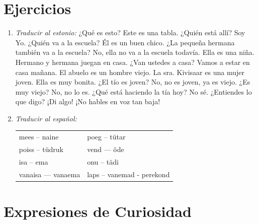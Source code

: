 \Large{\section*{Ejercicios}}

\begin{enumerate}
	\item \emph{Traducir al estonio:} ¿Qué es esto? Este es una tabla. ¿Quién está allí? Soy Yo. ¿Quién va a la escuela? Él es un buen chico. ¿La pequeña hermana también va a la escuela? No, ella no va a la escuela todavía. Ella es una niña. Hermano y hermana juegan en casa. ¿Van ustedes a casa? Vamos a estar en casa mañana. El abuelo es un hombre viejo. La sra. Kivisaar es una mujer joven. Ella es muy bonita. ¿El tío es joven? No, no es joven, ya es viejo. ¿Es muy viejo? No, no lo es. ¿Qué está haciendo la tía hoy? No sé. ¿Entiendes lo que digo? ¡Di algo! ¡No hables en voz tan baja!

	\item \emph{Traducir al español:} 

	\begin{center}
	\begin{tabular}{ l l }
		mees -- naine		& poeg -- tütar \\  
		poiss -- tüdruk   	& vend — õde \\ 
		isa -- ema 			& onu -- tädi \\
		vanaisa — vanaema	& laps -- vanemad - perekond
	\end{tabular}
	\end{center}
	\bigskip
\end{enumerate}

\Large{\section*{Expresiones de Curiosidad}}

